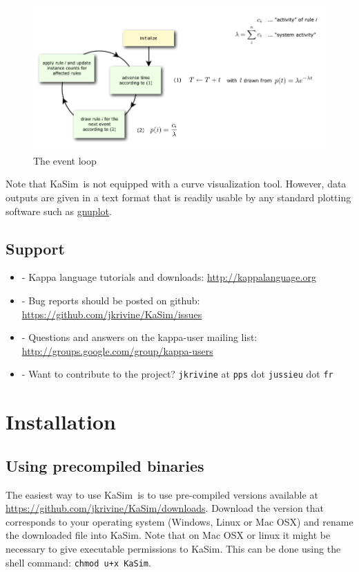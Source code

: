 \documentclass[11pt]{book}
\def\KaSim{\textsf{KaSim}}
\def\ttt#1{\texttt{#1}}
\def\ITE#1{\begin{itemize}#1\end{itemize}}
\begin{document}
\begin{figure}[htbp]
\begin{center}
\includegraphics[width=14cm]{img/event-loop.png}
\caption{The event loop}
\label{fig:event-loop}
\end{center}
\end{figure}

Note that \KaSim~is not equipped with a curve visualization tool. However, data outputs are given in a text format that is readily usable by any standard plotting software such as \href{http://www.gnuplot.info/}{gnuplot}.

\section{Support}
\ITE{
\item[-] Kappa language tutorials and downloads: \url{http://kappalanguage.org}
\item[-] Bug reports should be posted on github: \url{https://github.com/jkrivine/KaSim/issues}
\item[-] Questions and answers on the kappa-user mailing list: \url{http://groups.google.com/group/kappa-users}
\item[-] Want to contribute to the project? \ttt{jkrivine} at \ttt{pps} dot \ttt{jussieu} dot \ttt{fr}
}

\chapter{Installation}\label{chap:install}

\section{Using precompiled binaries}
The easiest way to use \KaSim~is to use pre-compiled versions available at \url{https://github.com/jkrivine/KaSim/downloads}. Download the version that corresponds to your operating system (Windows, Linux or Mac OSX) and rename the downloaded file into \KaSim. Note that on Mac OSX or linux it might be necessary to give executable permissions to \KaSim. This can be done using the shell command:  
\ttt{chmod u+x KaSim}. 
\end{document}
